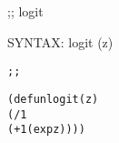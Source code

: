\begin{aibox}{\function}
;; logit

SYNTAX: logit (z) 
\end{aibox}

\begin{aibox}{\examples}

\end{aibox}

\begin{aibox}{\comments}

\end{aibox}
\begin{aibox}{\answers}

\end{aibox}
\begin{aibox}{\othercomments}

\end{aibox}
\begin{aibox}{\pseudocode}

\end{aibox}
\begin{aibox}{\code}

\begin{alltt}
;;%% code

(defun logit (z) 
    (/ 1
        (+ 1 (exp z))))

\end{alltt}
\end{aibox}
